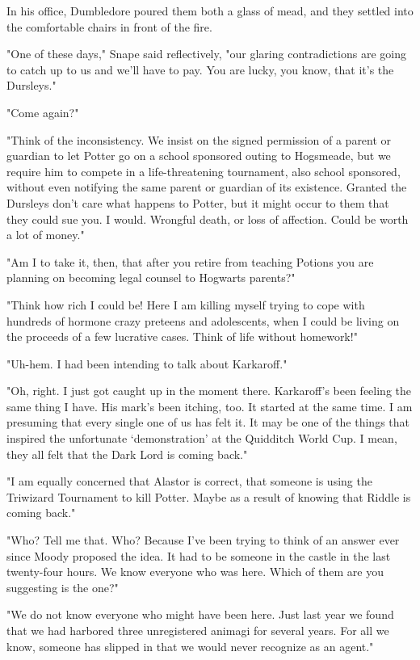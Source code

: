 In his office, Dumbledore poured them both a glass of mead, and they settled into the comfortable chairs in front of the fire.

"One of these days," Snape said reflectively, "our glaring contradictions are going to catch up to us and we'll have to pay. You are lucky, you know, that it's the Dursleys."

"Come again?"

"Think of the inconsistency. We insist on the signed permission of a parent or guardian to let Potter go on a school sponsored outing to Hogsmeade, but we require him to compete in a life-threatening tournament, also school sponsored, without even notifying the same parent or guardian of its existence. Granted the Dursleys don't care what happens to Potter, but it might occur to them that they could sue you. I would. Wrongful death, or loss of affection. Could be worth a lot of money."

"Am I to take it, then, that after you retire from teaching Potions you are planning on becoming legal counsel to Hogwarts parents?"

"Think how rich I could be! Here I am killing myself trying to cope with hundreds of hormone crazy preteens and adolescents, when I could be living on the proceeds of a few lucrative cases. Think of life without homework!"

"Uh-hem. I had been intending to talk about Karkaroff."

"Oh, right. I just got caught up in the moment there. Karkaroff's been feeling the same thing I have. His mark's been itching, too. It started at the same time. I am presuming that every single one of us has felt it. It may be one of the things that inspired the unfortunate `demonstration' at the Quidditch World Cup. I mean, they all felt that the Dark Lord is coming back."

"I am equally concerned that Alastor is correct, that someone is using the Triwizard Tournament to kill Potter. Maybe as a result of knowing that{\el} Riddle{\el} is coming back."

"Who? Tell me that. Who? Because I've been trying to think of an answer ever since Moody proposed the idea. It had to be someone in the castle in the last twenty-four hours. We know everyone who was here. Which of them are you suggesting is the one?"

"We do not know everyone who might have been here. Just last year we found that we had harbored three unregistered animagi for several years. For all we know, someone has slipped in that we would never recognize as an agent."

